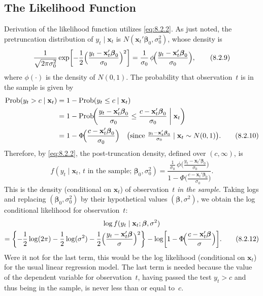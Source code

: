 \subsection*{The Likelihood Function}

Derivation of the likelihood function utilizes \eqref{eq:8.2.2}. As just noted, the pretruncation distribution of $y_t \mid \mathbf{x}_t$ is
$N(\mathbf{x}_t'\boldsymbol{\beta}_0, \sigma_0^2)$, whose density is
\begin{equation}
  \frac{1}{\sqrt{2\pi\sigma_0^2}}
  \exp\biggl[-\frac{1}{2}\Bigl(\frac{y_t - \mathbf{x}_t'\boldsymbol{\beta}_0}{\sigma_0}\Bigr)^2\biggr]
  = \frac{1}{\sigma_0}\,\phi\!\Bigl(\frac{y_t - \mathbf{x}_t'\boldsymbol{\beta}_0}{\sigma_0}\Bigr),
  \label{eq:8.2.9} \tag{8.2.9}
\end{equation}
where $\phi(\cdot)$ is the density of $N(0,1)$. The probability that observation~$t$ is in the
sample is given by
\begin{align}
  \text{Prob}(y_t > c \mid \mathbf{x}_t)
  &= 1 - \text{Prob}(y_t \leq c \mid \mathbf{x}_t) \notag \\
  &= 1 - \text{Prob}\!\biggl(\frac{y_t - \mathbf{x}_t'\boldsymbol{\beta}_0}{\sigma_0}
     \leq \frac{c - \mathbf{x}_t'\boldsymbol{\beta}_0}{\sigma_0}
     \;\bigg|\; \mathbf{x}_t\biggr) \notag \\
  &= 1 - \Phi\!\Bigl(\frac{c - \mathbf{x}_t'\boldsymbol{\beta}_0}{\sigma_0}\Bigr)
     \quad\bigl(\text{since } \tfrac{y_t - \mathbf{x}_t'\boldsymbol{\beta}_0}{\sigma_0}
     \mid \mathbf{x}_t \sim N(0,1)\bigr).
  \label{eq:8.2.10} \tag{8.2.10}
\end{align}
Therefore, by \eqref{eq:8.2.2}, the post-truncation density, defined over $(c, \infty)$, is
\begin{equation}
  f(y_t \mid \mathbf{x}_t,\, t \text{ in the sample};\,
    \boldsymbol{\beta}_0, \sigma_0^2)
  = \frac{\frac{1}{\sigma_0}\,\phi\!\bigl(\frac{y_t - \mathbf{x}_t'\boldsymbol{\beta}_0}{\sigma_0}\bigr)}
    {1 - \Phi\!\bigl(\frac{c - \mathbf{x}_t'\boldsymbol{\beta}_0}{\sigma_0}\bigr)}.
  \label{eq:8.2.11} \tag{8.2.11}
\end{equation}
This is the density (conditional on $\mathbf{x}_t$) of observation~$t$ \emph{in the sample}. Taking logs
and replacing $(\boldsymbol{\beta}_0, \sigma_0^2)$ by their hypothetical values $(\boldsymbol{\beta}, \sigma^2)$, we obtain the log conditional likelihood for observation~$t$:
\begin{multline}
  \log f(y_t \mid \mathbf{x}_t; \boldsymbol{\beta}, \sigma^2) \\
  = \biggl\{-\frac{1}{2}\log(2\pi) - \frac{1}{2}\log(\sigma^2)
    - \frac{1}{2}\Bigl(\frac{y_t - \mathbf{x}_t'\boldsymbol{\beta}}{\sigma}\Bigr)^2\biggr\}
    - \log\biggl[1 - \Phi\!\Bigl(\frac{c - \mathbf{x}_t'\boldsymbol{\beta}}{\sigma}\Bigr)\biggr].
  \label{eq:8.2.12} \tag{8.2.12}
\end{multline}
Were it not for the last term, this would be the log likelihood (conditional on $\mathbf{x}_t$) for
the usual linear regression model. The last term is needed because the value of the
dependent variable for observation~$t$, having passed the test $y_t > c$ and thus being
in the sample, is never less than or equal to~$c$.

